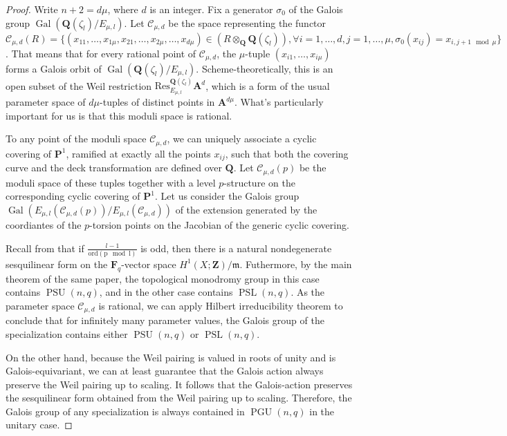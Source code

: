 \documentclass{article}
\theoremstyle{definition}
\DeclareMathOperator{\Gal}{\mathrm{Gal}}
\DeclareMathOperator{\PGU}{\mathrm{PGU}}
\DeclareMathOperator{\PSL}{\mathrm{PSL}}
\DeclareMathOperator{\PSU}{\mathrm{PSU}}
\begin{document}
	\begin{proof}
	Write $n+2 = d \mu$, where $d$ is an integer. Fix a generator $\sigma_0$ of the Galois group $\Gal(\mathbf{Q}(\zeta_l)/E_{\mu, l})$. Let $\mathcal{C}_{\mu,d}$ be the space representing the functor $\mathcal{C}_{\mu,d}(R) = \{ (x_{11}, \ldots, x_{1\mu}, x_{21}, \ldots, x_{2\mu}, \ldots, x_{d\mu}) \in (R \otimes_{\mathbf{Q}} \mathbf{Q}(\zeta_l)), \forall i = 1, \ldots, d, j = 1, \ldots, \mu, \sigma_0(x_{ij}) = x_{i, j+1 \mod \mu}\}$. That means that for every rational point of $\mathcal{C}_{\mu, d}$, the $\mu$-tuple $(x_{i1}, \ldots, x_{i\mu})$ forms a Galois orbit of $\Gal(\mathbf{Q}(\zeta_l)/E_{\mu,l})$. Scheme-theoretically, this is an open subset of the Weil restriction $\mathrm{Res}^{\mathbf{Q}(\zeta_l)}_{E_{\mu,l}} \mathbf{A}^d$, which is a form of the usual parameter space of $d \mu$-tuples of distinct points in $\mathbf{A}^{d \mu}$. What's particularly important for us is that this moduli space is rational. \par 
	To any point of the moduli space $\mathcal{C}_{\mu, d}$, we can uniquely associate a cyclic covering of $\mathbf{P}^1$, ramified at exactly all the points $x_{ij}$, such that both the covering curve and the deck transformation are defined over $\mathbf{Q}$. 
	Let $\mathcal{C}_{\mu, d}(p)$ be the moduli space of these tuples together with a level $p$-structure on the corresponding cyclic covering of $\mathbf{P}^1$.  Let us consider the Galois group $\Gal(E_{\mu,l}(\mathcal{C}_{\mu,d}(p))/E_{\mu,l}(\mathcal{C}_{\mu,d}))$ of the extension generated by the coordiantes of the $p$-torsion points on the Jacobian of the generic cyclic covering. \par 
	Recall from \cite{nesterov} that if $\frac{l-1}{\mathrm{ord (p \mod l)}}$ is odd, then there is a natural nondegenerate sesquilinear form on the $\mathbf{F}_q$-vector space $H^1(X; \mathbf{Z})/\mathfrak{m}$. Futhermore, by the main theorem of the same paper, the topological monodromy group in this case contains $\PSU(n, q)$, and in the other case contains $\PSL(n, q)$. As the parameter space $\mathcal{C}_{\mu,d}$  is rational, we can apply Hilbert irreducibility theorem to conclude that for infinitely many parameter values, the Galois group of the specialization contains either $\PSU(n, q)$ or $\PSL(n, q)$. \par 
	On the other hand, because the Weil pairing is valued in roots of unity and is Galois-equivariant, we can at least guarantee that the Galois action always preserve the Weil pairing up to scaling. It follows that the Galois-action preserves the sesquilinear form obtained from the Weil pairing up to scaling. Therefore, the Galois group of any specialization is always contained in $\PGU(n, q)$ in the unitary case.
	\end{proof}
\end{document}
